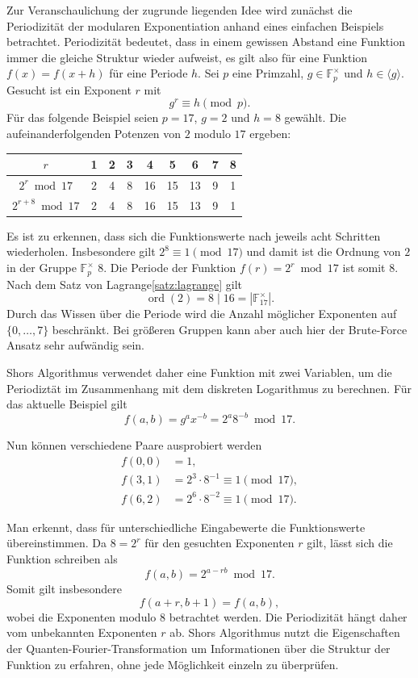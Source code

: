 Zur Veranschaulichung der zugrunde liegenden Idee wird zunächst die Periodizität der modularen Exponentiation anhand eines einfachen Beispiels betrachtet. Periodizität bedeutet, dass in einem gewissen Abstand eine Funktion immer die gleiche Struktur wieder aufweist, es gilt also für eine Funktion $f(x)=f(x+h)$ für eine Periode $h$. Sei $p$ eine Primzahl, $g\in\mathbb{F}_p^\times$ und $h\in\langle g\rangle$. Gesucht ist ein Exponent $r$ mit
\[
    g^r\equiv h\pmod p.
\]
Für das folgende Beispiel seien $p=17$, $g=2$ und $h=8$ gewählt. Die aufeinanderfolgenden Potenzen von $2$ modulo $17$ ergeben:
\begin{center}
\begin{tabular}{c|cccccccc}
$r$ & 1 & 2 & 3 & 4 & 5 & 6 & 7 & 8 \\
\hline
$2^r \bmod 17$
& 2 & 4 & 8 & 16 & 15 & 13 & 9 & 1 \\
$2^{r+8} \bmod 17$
& 2 & 4 & 8 & 16 & 15 & 13 & 9 & 1
\end{tabular}
\end{center}
Es ist zu erkennen, dass sich die Funktionswerte nach jeweils acht Schritten wiederholen. Insbesondere gilt \(2^8\equiv 1\pmod{17}\) und damit ist die Ordnung von $2$ in der Gruppe $\mathbb{F}_p^\times$ $8$. Die Periode der Funktion $f(r)=2^r\bmod 17$ ist somit $8$. Nach dem Satz von Lagrange\ref{satz:lagrange} gilt
\[
    \operatorname{ord}(2)=8\mid 16
    =|\mathbb{F}_{17}^{\times}|.
\]
Durch das Wissen über die Periode wird die Anzahl möglicher Exponenten auf $\{0,\ldots,7\}$ beschränkt. Bei größeren Gruppen kann aber auch hier der Brute-Force Ansatz sehr aufwändig sein.

Shors Algorithmus verwendet daher eine Funktion mit zwei Variablen, um die Periodiztät im Zusammenhang mit dem diskreten Logarithmus zu berechnen. Für das aktuelle Beispiel gilt
\[
f(a,b)=g^a x^{-b}=2^a8^{-b}\bmod 17.
\]

Nun können verschiedene Paare ausprobiert werden
\begin{align*}
    f(0,0)&=1,\\
    f(3,1)&=2^3\cdot8^{-1}\equiv1\pmod{17},\\
    f(6,2)&=2^6\cdot8^{-2}\equiv1\pmod{17}.
\end{align*}

Man erkennt, dass für unterschiedliche Eingabewerte die Funktionswerte übereinstimmen. Da $8=2^r$ für den gesuchten Exponenten $r$ gilt, lässt sich die Funktion schreiben als
\[
    f(a,b)=2^{a-rb}\bmod17.
\]
Somit gilt insbesondere
\[
    f(a+r,b+1)=f(a,b),
\]
wobei die Exponenten modulo $8$ betrachtet werden. Die Periodizität hängt daher vom unbekannten Exponenten $r$ ab. Shors Algorithmus nutzt die Eigenschaften der Quanten-Fourier-Transformation um Informationen über die Struktur der Funktion zu erfahren, ohne jede Möglichkeit einzeln zu überprüfen.


